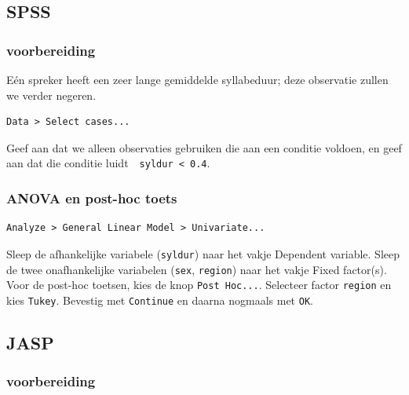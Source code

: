 \documentclass[
]{book}
\begin{document}
\hypertarget{spss-13}{%
\subsection{SPSS}\label{spss-13}}

\hypertarget{voorbereiding-4}{%
\subsubsection{voorbereiding}\label{voorbereiding-4}}

Eén spreker heeft een zeer lange gemiddelde syllabeduur; deze observatie
zullen we verder negeren.

\begin{verbatim}
Data > Select cases...
\end{verbatim}

Geef aan dat we alleen observaties gebruiken die aan een conditie
voldoen, en geef aan dat die conditie luidt~~\texttt{syldur\ \textless{}\ 0.4}.

\hypertarget{anova-en-post-hoc-toets}{%
\subsubsection{ANOVA en post-hoc toets}\label{anova-en-post-hoc-toets}}

\begin{verbatim}
Analyze > General Linear Model > Univariate...
\end{verbatim}

Sleep de afhankelijke variabele (\texttt{syldur}) naar het vakje Dependent
variable. Sleep de twee onafhankelijke variabelen (\texttt{sex}, \texttt{region}) naar het
vakje Fixed factor(s).\\
Voor de post-hoc toetsen, kies de knop \texttt{Post\ Hoc...}. Selecteer factor
\texttt{region} en kies \texttt{Tukey}. Bevestig met \texttt{Continue} en daarna nogmaals met
\texttt{OK}.

\hypertarget{jasp-15}{%
\subsection{JASP}\label{jasp-15}}

\hypertarget{voorbereiding-5}{%
\subsubsection{voorbereiding}\label{voorbereiding-5}}
\end{document}
